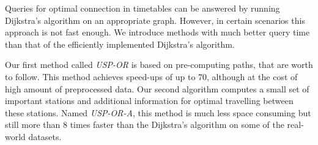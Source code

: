 Queries for optimal connection in timetables can be answered by running Dijkstra's algorithm on an appropriate graph. However, in certain scenarios this approach is not fast enough. We introduce methods with much better query time than that of the efficiently implemented Dijkstra's algorithm.

Our first method called {\it USP-OR} is based on pre-computing paths, that are worth to follow. This method achieves speed-ups of up to 70, although at the cost of high amount of preprocessed data. Our second algorithm computes a small set of important stations and additional information for optimal travelling between these stations. Named {\it USP-OR-A}, this method is much less space consuming but still more than 8 times faster than the Dijkstra's algorithm on some of the real-world datasets.
